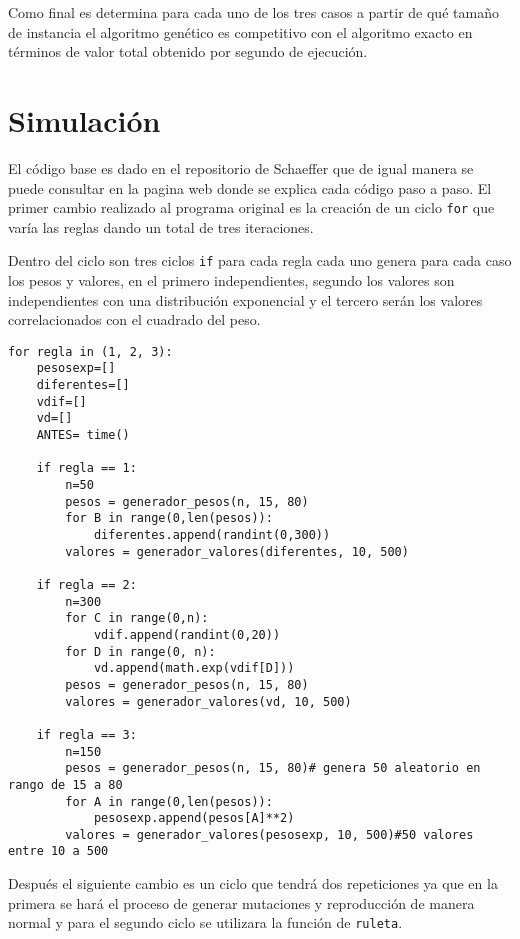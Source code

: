 \documentclass[a4paper, 11pt]{article}
\begin{document}
Como final es determina para cada uno de los tres casos a partir de qué tamaño de instancia el algoritmo genético es competitivo con el algoritmo exacto en términos de valor total obtenido por segundo de ejecución.

\section{Simulación}
El código base es dado en el repositorio de Schaeffer \cite{elisa} que de igual manera se puede consultar en la pagina web \cite{dra} donde se explica cada código paso a paso.
El primer cambio realizado al programa original es la creación de un ciclo \texttt{for} que varía las reglas dando un total de tres iteraciones.

Dentro del ciclo son tres ciclos \texttt{if} para cada regla cada uno genera para cada caso los pesos y valores, en el primero independientes, segundo los valores son independientes con una distribución exponencial y el tercero serán los valores correlacionados con el cuadrado del peso.

\begin{verbatim}
for regla in (1, 2, 3):
    pesosexp=[]
    diferentes=[]
    vdif=[]
    vd=[]
    ANTES= time()
    
    if regla == 1:
        n=50
        pesos = generador_pesos(n, 15, 80)
        for B in range(0,len(pesos)):
            diferentes.append(randint(0,300))
        valores = generador_valores(diferentes, 10, 500)
  
    if regla == 2:
        n=300
        for C in range(0,n):
            vdif.append(randint(0,20))
        for D in range(0, n):
            vd.append(math.exp(vdif[D]))
        pesos = generador_pesos(n, 15, 80)
        valores = generador_valores(vd, 10, 500)

    if regla == 3:
        n=150
        pesos = generador_pesos(n, 15, 80)# genera 50 aleatorio en rango de 15 a 80
        for A in range(0,len(pesos)):
            pesosexp.append(pesos[A]**2)
        valores = generador_valores(pesosexp, 10, 500)#50 valores entre 10 a 500

\end{verbatim}

Después el siguiente cambio es un ciclo que tendrá dos repeticiones ya que en la primera se hará el proceso de generar mutaciones y reproducción de manera normal y para el segundo ciclo se utilizara la función de \texttt{ruleta}.
\end{document}

